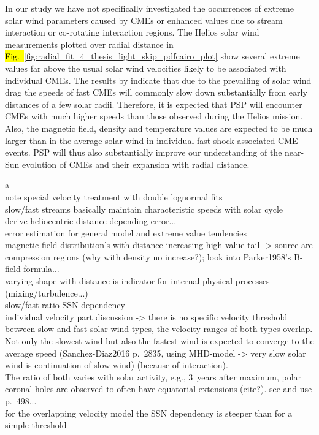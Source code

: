 In our study we have not specifically investigated the occurrences of extreme solar wind parameters caused by CMEs or enhanced values due to stream interaction or co-rotating interaction regions. The Helios solar wind measurements plotted over radial distance in \hl{Fig.~}\ref{fig:radial_fit_4_thesis_light_skip_pdfcairo_plot} show several extreme values far above the usual solar wind velocities likely to be associated with individual CMEs. The results by \citet{Sachdeva2017} indicate that due to the prevailing of solar wind drag the speeds of fast CMEs will commonly slow down substantially from early distances of a few solar radii. Therefore, it is expected that PSP will encounter CMEs with much higher speeds than those observed during the Helios mission. Also, the magnetic field, density and temperature values are expected to be much larger than in the average solar wind in individual fast shock associated CME events. PSP will thus also substantially improve our understanding of the near-Sun evolution of CMEs and their expansion with radial distance.

a\\

note special velocity treatment with double lognormal fits\\
slow/fast streams basically maintain characteristic speeds with solar cycle\\


derive heliocentric distance depending error...\\
error estimation for general model and extreme value tendencies\\

magnetic field distribution's with distance increasing high value tail -> source are compression regions (why with density no increase?); look into Parker1958's B-field formula...\\
varying shape with distance is indicator for internal physical processes (mixing/turbulence...)\\

slow/fast ratio SSN dependency\\
individual velocity part discussion -> there is no specific velocity threshold between slow and fast solar wind types, the velocity ranges of both types overlap.\\
Not only the slowest wind but also the fastest wind is expected to converge to the average speed (Sanchez-Diaz2016 p.~2835, using MHD-model -> very slow solar wind is continuation of slow wind) (because of interaction).\\
The ratio of both varies with solar activity, e.g., 3~years after maximum, polar coronal holes are observed to often have equatorial extensions (cite?). see and use \citet{Bougeret1984} p.~498...\\
for the overlapping velocity model the SSN dependency is steeper than for a simple threshold\\


